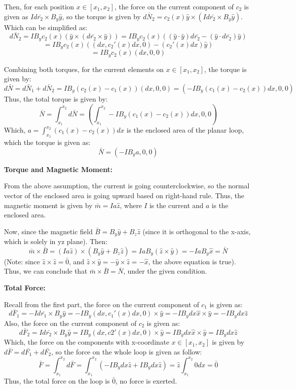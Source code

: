 \documentclass{article}
\begin{document}
Then, for each position $x\in[x_1,x_2]$, the force on the current component of $c_2$ is given as $Id\bar{r_2}\times B_y\hat{y}$,
so the torque is given by $d\bar{N}_2 = c_2(x)\hat{y}\times (Id\bar{r_2}\times B_y\hat{y})$. Which can be simplified as:
$$d\bar{N}_2 = IB_yc_2(x)(\hat{y}\times(d\bar{r_2}\times \hat{y})) = IB_yc_2(x)((\hat{y}\cdot\hat{y})d\bar{r_2}-(\hat{y}\cdot d\bar{r_2})\hat{y})$$
$$=IB_yc_2(x)((dx,c_2'(x)dx,0)-(c_2'(x)dx)\hat{y})$$
$$=IB_yc_2(x)(dx,0,0)$$

\hfill

Combining both torques, for the current elements on $x\in[x_1,x_2]$, the torque is given by:
$$d\bar{N}=d\bar{N}_1+d\bar{N}_2 = IB_y(c_2(x)-c_1(x))(dx,0,0) = (-IB_y(c_1(x)-c_2(x))dx,0,0)$$
Thus, the total torque is given by:
$$\bar{N}=\int_{x_1}^{x_2}d\bar{N} = \left(\int_{x_1}^{x_2}-IB_y(c_1(x)-c_2(x))dx,0,0\right)$$
Which, $a=\int_{x_1}^{x_2}(c_1(x)-c_2(x))dx$ is the enclosed area of the planar loop, which the torque is given as:
$$\bar{N}=(-IB_ya,0,0)$$

\hfill

\textbf{Torque and Magnetic Moment:}

From the above assumption, the current is going counterclockwise, so the normal vector of the enclosed area is going upward based on right-hand rule.
Thus, the magnetic moment is given by $\bar{m}=Ia\hat{z}$, where $I$ is the current and $a$ is the enclosed area.

Now, since the magnetic field $\bar{B}=B_y\hat{y}+B_z\hat{z}$ (since it is orthogonal to the x-axis, which is solely in yz plane). Then:
$$\bar{m}\times \bar{B}=(Ia\hat{z})\times(B_y\hat{y}+B_z\hat{z}) = IaB_y(\hat{z}\times \hat{y}) = -IaB_y\hat{x}=\bar{N}$$
(Note: since $\hat{z}\times\hat{z}=\bar{0}$, and $\hat{z}\times\hat{y}=-\hat{y}\times\hat{z}=-\hat{x}$, the above equation is true).
Thus, we can conclude that $\bar{m}\times\bar{B}=\bar{N}$, under the given condition.

\hfill

\textbf{Total Force:}

Recall from the first part, the force on the current component of $c_1$ is given as: 
$$d\bar{F}_1=-Id\bar{r_1}\times B_y\hat{y} = -IB_y(dx,c_1'(x)dx,0)\times\hat{y} = -IB_ydx\hat{x}\times \hat{y} = -IB_ydx\hat{z}$$
Also, the force on the current component of $c_2$ is given as:
$$d\bar{F}_2 = Id\bar{r_2}\times B_y\hat{y}=IB_y(dx,c2'(x)dx,0)\times \hat{y}=IB_ydx\hat{x}\times\hat{y}=IB_ydx\hat{z}$$
Which, the force on the components with x-coordinate $x\in[x_1,x_2]$ is given by $d\bar{F} = d\bar{F_1}+d\bar{F_2}$, 
so the force on the whole loop is given as follow:
$$\bar{F} = \int_{x_1}^{x_2}d\bar{F}=\int_{x_1}^{x_2}(-IB_ydx\hat{z}+IB_ydx\hat{z}) = \hat{z}\int_{x_1}^{x_2}0dx = \bar{0}$$
Thus, the total force on the loop is $\bar{0}$, no force is exerted.
\end{document}
